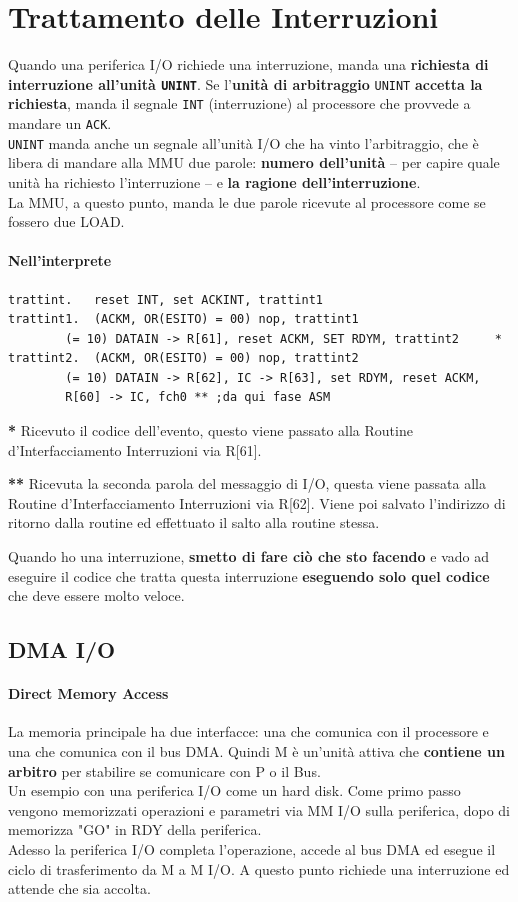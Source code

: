 \documentclass[10pt]{report}
\begin{document}
\section{Trattamento delle Interruzioni}
Quando una periferica I/O richiede una interruzione, manda una \textbf{richiesta di interruzione all'unità \texttt{UNINT}}. Se l'\textbf{unità di arbitraggio} \texttt{UNINT} \textbf{accetta la richiesta}, manda il segnale \texttt{INT} (interruzione) al processore che provvede a mandare un \texttt{ACK}.\\
\texttt{UNINT} manda anche un segnale all'unità I/O che ha vinto l'arbitraggio, che è libera di mandare alla MMU due parole: \textbf{numero dell'unità} -- per capire quale unità ha richiesto l'interruzione -- e \textbf{la ragione dell'interruzione}.\\
La MMU, a questo punto, manda le due parole ricevute al processore come se fossero due LOAD.
\paragraph{Nell'interprete}
\begin{lstlisting}
trattint.	reset INT, set ACKINT, trattint1
trattint1.	(ACKM, OR(ESITO) = 00) nop, trattint1
		(= 10) DATAIN -> R[61], reset ACKM, SET RDYM, trattint2		*
trattint2.	(ACKM, OR(ESITO) = 00) nop, trattint2
		(= 10) DATAIN -> R[62], IC -> R[63], set RDYM, reset ACKM,
		R[60] -> IC, fch0 ** ;da qui fase ASM
\end{lstlisting}
\begin{list}{}{}
	\item \textbf{*} Ricevuto il codice dell'evento, questo viene passato alla Routine d'Interfacciamento Interruzioni via R[61].
	\item \textbf{**} Ricevuta la seconda parola del messaggio di I/O, questa viene passata alla Routine d'Interfacciamento Interruzioni via R[62]. Viene poi salvato l'indirizzo di ritorno dalla routine ed effettuato il salto alla routine stessa.
\end{list}
Quando ho una interruzione, \textbf{smetto di fare ciò che sto facendo} e vado ad eseguire il codice che tratta questa interruzione \textbf{eseguendo solo quel codice} che deve essere molto veloce.
\pagebreak
\subsection{DMA I/O}
\paragraph{Direct Memory Access} La memoria principale ha due interfacce: una che comunica con il processore e una che comunica con il bus DMA. Quindi M è un'unità attiva che \textbf{contiene un arbitro} per stabilire se comunicare con P o il Bus.\\
Un esempio con una periferica I/O come un hard disk. Come primo passo vengono memorizzati operazioni e parametri via MM I/O sulla periferica, dopo di memorizza "GO" in RDY della periferica.\\
Adesso la periferica I/O completa l'operazione, accede al bus DMA ed esegue il ciclo di trasferimento da M a M I/O. A questo punto richiede una interruzione ed attende che sia accolta.
\pagebreak
\end{document}
